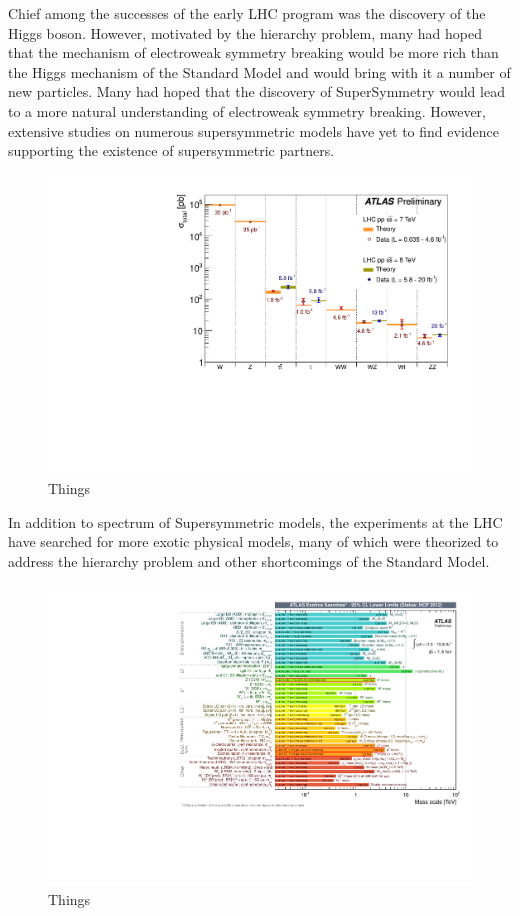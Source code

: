 Chief among the successes of the early LHC program was the discovery of the Higgs boson.
However, motivated by the hierarchy problem, many had hoped that the mechanism of electroweak
symmetry breaking would be more rich than the Higgs mechanism of the Standard Model and
would bring with it a number of new particles.
Many had hoped that the discovery of SuperSymmetry would lead to a more natural understanding
of electroweak symmetry breaking.
However, extensive studies on numerous supersymmetric models have yet to find evidence
supporting the existence of supersymmetric partners.

\begin{figure}[ht!]
  \begin{center}
    \includegraphics[width=.75\textwidth]{figures/conclusion/SM_SummaryPlotMoriondEWK2013}
    \caption{Things}
    \label{fig:xsec_vs_roots}
  \end{center}
\end{figure}
\clearpage

In addition to spectrum of Supersymmetric models, the experiments at the LHC have searched
for more exotic physical models, many of which were theorized to address the hierarchy
problem and other shortcomings of the Standard Model.

\begin{figure}[ht!]
  \begin{center}
    \includegraphics[width=.75\textwidth]{figures/conclusion/ExoticResultsSummary}
    \caption{Things}
    \label{fig:xsec_vs_roots}
  \end{center}
\end{figure}

